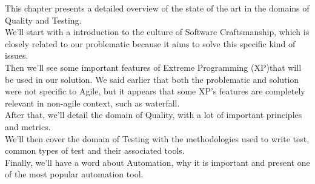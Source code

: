 This chapter presents a detailed overview of the state of the art in the
domains of Quality and Testing. \\
We'll start with a introduction to the culture of Software Craftsmanship,
which is closely related to our problematic because it aims to solve this
specific kind of issues.  \\
Then we'll see some important features of Extreme Programming (XP)that will
be used in our solution.
We said earlier that both the problematic and solution were not specific to
Agile, but it appears that some XP's features are completely relevant in
non-agile context, such as waterfall. \\
After that, we'll detail the domain of Quality, with a lot of important
principles and metrics. \\
We'll then cover the domain of Testing with the methodologies used to write
test, common types of test and their associated tools. \\
Finally, we'll have a word about Automation, why it is important and
present one of the most popular automation tool.










